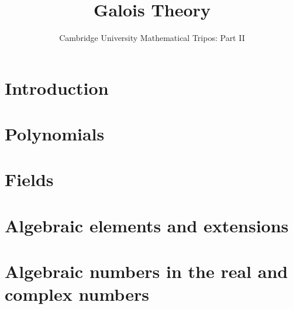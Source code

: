 \documentclass{article}
\title{Galois Theory}
\author{Cambridge University Mathematical Tripos: Part II}
\begin{document}
\maketitle

\tableofcontentsnewpage{}

\section{Introduction}

\section{Polynomials}

\section{Fields}

\section{Algebraic elements and extensions}

\section{Algebraic numbers in the real and complex numbers}

\end{document}
